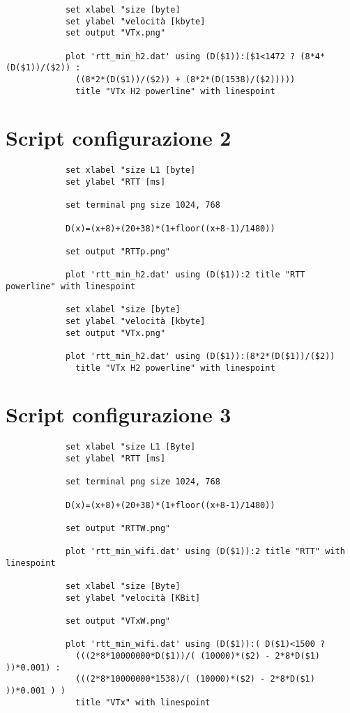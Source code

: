 \documentclass[../lab2.tex]{subfiles}
\begin{document}
\begin{appendices}
\begin{verbatim}
            set xlabel "size [byte]
            set ylabel "velocità [kbyte]
            set output "VTx.png"

            plot 'rtt_min_h2.dat' using (D($1)):($1<1472 ? (8*4*(D($1))/($2)) : 
              ((8*2*(D($1))/($2)) + (8*2*(D(1538)/($2)))))   
              title "VTx H2 powerline" with linespoint
        \end{verbatim}

    \section{Script configurazione 2}
        \begin{verbatim}
            set xlabel "size L1 [byte]
            set ylabel "RTT [ms]

            set terminal png size 1024, 768

            D(x)=(x+8)+(20+38)*(1+floor((x+8-1)/1480))

            set output "RTTp.png"

            plot 'rtt_min_h2.dat' using (D($1)):2 title "RTT powerline" with linespoint

            set xlabel "size [byte]
            set ylabel "velocità [kbyte]
            set output "VTx.png"

            plot 'rtt_min_h2.dat' using (D($1)):(8*2*(D($1))/($2)) 
              title "VTx H2 powerline" with linespoint
        \end{verbatim}
        \pagebreak
        \section{Script configurazione 3}
        \begin{verbatim}
            set xlabel "size L1 [Byte]
            set ylabel "RTT [ms]

            set terminal png size 1024, 768

            D(x)=(x+8)+(20+38)*(1+floor((x+8-1)/1480))

            set output "RTTW.png"

            plot 'rtt_min_wifi.dat' using (D($1)):2 title "RTT" with linespoint

            set xlabel "size [Byte]
            set ylabel "velocità [KBit]

            set output "VTxW.png"

            plot 'rtt_min_wifi.dat' using (D($1)):( D($1)<1500 ? 
              (((2*8*10000000*D($1))/( (10000)*($2) - 2*8*D($1) ))*0.001) :
              (((2*8*10000000*1538)/( (10000)*($2) - 2*8*D($1) ))*0.001 ) ) 
              title "VTx" with linespoint
        \end{verbatim}


\end{appendices}
\end{document}
